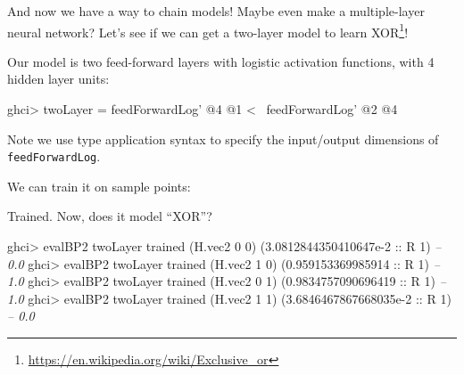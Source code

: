 \documentclass[]{article}
\newenvironment{Shaded}{}{}
\newcommand{\CommentTok}[1]{\textcolor[rgb]{0.38,0.63,0.69}{\textit{#1}}}
\newcommand{\DataTypeTok}[1]{\textcolor[rgb]{0.56,0.13,0.00}{#1}}
\newcommand{\DecValTok}[1]{\textcolor[rgb]{0.25,0.63,0.44}{#1}}
\newcommand{\FloatTok}[1]{\textcolor[rgb]{0.25,0.63,0.44}{#1}}
\newcommand{\FunctionTok}[1]{\textcolor[rgb]{0.02,0.16,0.49}{#1}}
\newcommand{\NormalTok}[1]{#1}
\newcommand{\OtherTok}[1]{\textcolor[rgb]{0.00,0.44,0.13}{#1}}
\renewcommand{\href}[2]{#2\footnote{\url{#1}}}
\begin{document}
And now we have a way to chain models! Maybe even make a multiple-layer neural
network? Let's see if we can get a two-layer model to learn
\href{https://en.wikipedia.org/wiki/Exclusive_or}{XOR}!

Our model is two feed-forward layers with logistic activation functions, with 4
hidden layer units:

\begin{Shaded}
\begin{Highlighting}[]
\NormalTok{ghci}\FunctionTok{>}\NormalTok{ twoLayer }\FunctionTok{=}\NormalTok{ feedForwardLog' }\FunctionTok{@}\DecValTok{4} \FunctionTok{@}\DecValTok{1} \FunctionTok{<~}\NormalTok{ feedForwardLog' }\FunctionTok{@}\DecValTok{2} \FunctionTok{@}\DecValTok{4}
\end{Highlighting}
\end{Shaded}

Note we use type application syntax to specify the input/output dimensions of
\texttt{feedForwardLog\textquotesingle{}}.

We can train it on sample points:

\begin{Shaded}
\end{Shaded}

Trained. Now, does it model ``XOR''?

\begin{Shaded}
\begin{Highlighting}[]
\NormalTok{ghci}\FunctionTok{>}\NormalTok{ evalBP2 twoLayer trained (H.vec2 }\DecValTok{0} \DecValTok{0}\NormalTok{)}
\NormalTok{(}\FloatTok{3.0812844350410647e-2}\OtherTok{ ::} \DataTypeTok{R} \DecValTok{1}\NormalTok{)          }\CommentTok{-- 0.0}
\NormalTok{ghci}\FunctionTok{>}\NormalTok{ evalBP2 twoLayer trained (H.vec2 }\DecValTok{1} \DecValTok{0}\NormalTok{)}
\NormalTok{(}\FloatTok{0.959153369985914}\OtherTok{ ::} \DataTypeTok{R} \DecValTok{1}\NormalTok{)              }\CommentTok{-- 1.0}
\NormalTok{ghci}\FunctionTok{>}\NormalTok{ evalBP2 twoLayer trained (H.vec2 }\DecValTok{0} \DecValTok{1}\NormalTok{)}
\NormalTok{(}\FloatTok{0.9834757090696419}\OtherTok{ ::} \DataTypeTok{R} \DecValTok{1}\NormalTok{)             }\CommentTok{-- 1.0}
\NormalTok{ghci}\FunctionTok{>}\NormalTok{ evalBP2 twoLayer trained (H.vec2 }\DecValTok{1} \DecValTok{1}\NormalTok{)}
\NormalTok{(}\FloatTok{3.6846467867668035e-2}\OtherTok{ ::} \DataTypeTok{R} \DecValTok{1}\NormalTok{)          }\CommentTok{-- 0.0}
\end{Highlighting}
\end{Shaded}
\end{document}
